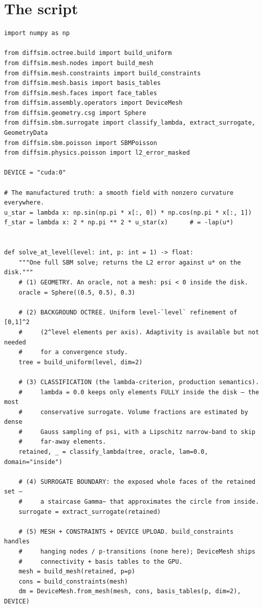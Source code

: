 \section*{The script}
\begin{lstlisting}
import numpy as np

from diffsim.octree.build import build_uniform
from diffsim.mesh.nodes import build_mesh
from diffsim.mesh.constraints import build_constraints
from diffsim.mesh.basis import basis_tables
from diffsim.mesh.faces import face_tables
from diffsim.assembly.operators import DeviceMesh
from diffsim.geometry.csg import Sphere
from diffsim.sbm.surrogate import classify_lambda, extract_surrogate, GeometryData
from diffsim.sbm.poisson import SBMPoisson
from diffsim.physics.poisson import l2_error_masked

DEVICE = "cuda:0"

# The manufactured truth: a smooth field with nonzero curvature everywhere.
u_star = lambda x: np.sin(np.pi * x[:, 0]) * np.cos(np.pi * x[:, 1])
f_star = lambda x: 2 * np.pi ** 2 * u_star(x)      # = -lap(u*)


def solve_at_level(level: int, p: int = 1) -> float:
    """One full SBM solve; returns the L2 error against u* on the disk."""
    # (1) GEOMETRY. An oracle, not a mesh: psi < 0 inside the disk.
    oracle = Sphere((0.5, 0.5), 0.3)

    # (2) BACKGROUND OCTREE. Uniform level-`level` refinement of [0,1]^2
    #     (2^level elements per axis). Adaptivity is available but not needed
    #     for a convergence study.
    tree = build_uniform(level, dim=2)

    # (3) CLASSIFICATION (the lambda-criterion, production semantics).
    #     lambda = 0.0 keeps only elements FULLY inside the disk — the most
    #     conservative surrogate. Volume fractions are estimated by dense
    #     Gauss sampling of psi, with a Lipschitz narrow-band to skip
    #     far-away elements.
    retained, _ = classify_lambda(tree, oracle, lam=0.0, domain="inside")

    # (4) SURROGATE BOUNDARY: the exposed whole faces of the retained set —
    #     a staircase Gamma~ that approximates the circle from inside.
    surrogate = extract_surrogate(retained)

    # (5) MESH + CONSTRAINTS + DEVICE UPLOAD. build_constraints handles
    #     hanging nodes / p-transitions (none here); DeviceMesh ships
    #     connectivity + basis tables to the GPU.
    mesh = build_mesh(retained, p=p)
    cons = build_constraints(mesh)
    dm = DeviceMesh.from_mesh(mesh, cons, basis_tables(p, dim=2), DEVICE)


\end{lstlisting}
